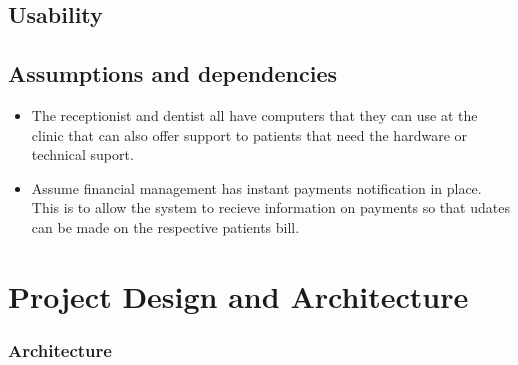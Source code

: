 \documentclass[11 pt]{article}
\begin{document}
\subsection{Usability}
\subsection{Assumptions and dependencies}
\begin{itemize}
\item
The receptionist and dentist all have computers that they can use at the clinic that can also offer support to patients that need the hardware or technical suport. 
\item
Assume financial management has instant payments notification in place. This is to allow the system to recieve information on payments so that udates can be made on the respective patients bill.
\end{itemize}
\newpage   
\section{Project Design and Architecture}
 
    \subsubsection{Architecture}
    
\end{document}
